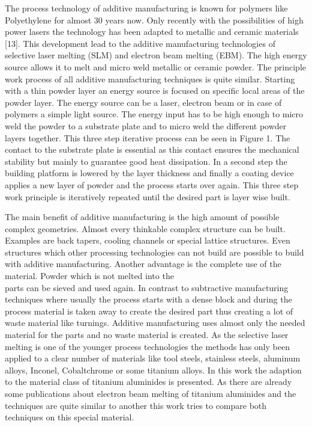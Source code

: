 \documentclass[10pt]{article}
\begin{document}
The process technology of additive manufacturing is known for polymers like Polyethylene for almost 30 years now. Only recently with the possibilities of high power lasers the technology has been adapted to metallic and ceramic materials [13]. This development lead to the additive manufacturing technologies of selective laser melting (SLM) and electron beam melting (EBM). The high energy source allows it to melt and micro weld metallic or ceramic powder. The principle work process of all additive manufacturing techniques is quite similar. Starting with a thin powder layer an energy source is focused on specific local areas of the powder layer. The energy source can be a laser, electron beam or in case of polymers a simple light source. The energy input has to be high enough to micro weld the powder to a substrate plate and to micro weld the different powder layers together. This three step iterative process can be seen in Figure 1. The contact to the substrate plate is essential as this contact ensures the mechanical stability but mainly to guarantee good heat dissipation. In a second step the building platform is lowered by the layer thickness and finally a coating device applies a new layer of powder and the process starts over again. This three step work principle is iteratively repeated until the desired part is layer wise built.

The main benefit of additive manufacturing is the high amount of possible complex geometries. Almost every thinkable complex structure can be built. Examples are back tapers, cooling channels or special lattice structures. Even structures which other processing technologies can not build are possible to build with additive manufacturing. Another advantage is the complete use of the material. Powder which is not melted into the\\
parts can be sieved and used again. In contrast to subtractive manufacturing techniques where usually the process starts with a dense block and during the process material is taken away to create the desired part thus creating a lot of waste material like turnings. Additive manufacturing uses almost only the needed material for the parts and no waste material is created. As the selective laser melting is one of the younger process technologies the methods has only been applied to a clear number of materials like tool steels, stainless steels, aluminum alloys, Inconel, Cobaltchrome or some titanium alloys. In this work the adaption to the material class of titanium aluminides is presented. As there are already some publications about electron beam melting of titanium aluminides and the techniques are quite similar to another this work tries to compare both techniques on this special material.
\end{document}
